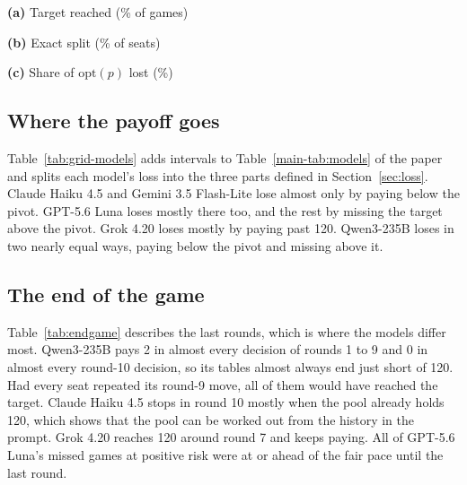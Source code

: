 \documentclass[10pt]{article}
\let\plainsubsection\subsection
\renewcommand{\subsection}{\FloatBarrier\needspace{8\baselineskip}\plainsubsection}
\begin{document}
\begin{table}[h]
\caption{Self-play outcomes by risk level, ten games per cell. (a) Games reaching the target. (b) Seats paying 2 in all ten rounds. (c) Share of the attainable expected payoff $\mathrm{opt}(p)$ lost; the Panel row pools the five models. \emph{All} pools the grid and matches Table~\ref{main-tab:models} of the paper.}
\label{tab:grid-outcomes}
\centering\small
\textbf{(a)} Target reached (\% of games)\par\smallskip
\par\bigskip
\textbf{(b)} Exact split (\% of seats)\par\smallskip
\par\bigskip
\textbf{(c)} Share of $\mathrm{opt}(p)$ lost (\%)\par\smallskip

\end{table}

\subsection{Where the payoff goes}

Table~\ref{tab:grid-models} adds intervals to Table~\ref{main-tab:models} of the paper and splits each model's loss into the three parts defined in Section~\ref{sec:loss}. Claude Haiku 4.5 and Gemini 3.5 Flash-Lite lose almost only by paying below the pivot. GPT-5.6 Luna loses mostly there too, and the rest by missing the target above the pivot. Grok 4.20 loses mostly by paying past 120. Qwen3-235B loses in two nearly equal ways, paying below the pivot and missing above it.

\begin{table}[h]
\caption{Self-play summary with intervals. At $p=0$: mean seat total with its interval and the number of seats paying anything. \emph{Payoff lost}: share of $\mathrm{opt}(p)$ lost over the grid, with a bootstrap interval that resamples games within each risk level. \emph{Share of the loss}: the three parts of Section~\ref{sec:loss} as shares of each model's total loss.}
\label{tab:grid-models}
\centering\small

\end{table}

\subsection{The end of the game}

Table~\ref{tab:endgame} describes the last rounds, which is where the models differ most. Qwen3-235B pays 2 in almost every decision of rounds 1 to 9 and 0 in almost every round-10 decision, so its tables almost always end just short of 120. Had every seat repeated its round-9 move, all of them would have reached the target. Claude Haiku 4.5 stops in round 10 mostly when the pool already holds 120, which shows that the pool can be worked out from the history in the prompt. Grok 4.20 reaches 120 around round 7 and keeps paying. All of GPT-5.6 Luna's missed games at positive risk were at or ahead of the fair pace until the last round.
\end{document}
